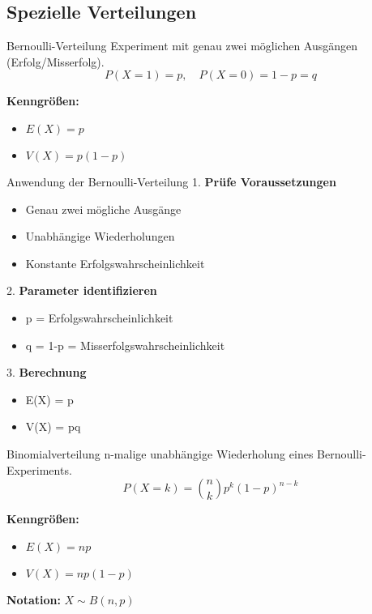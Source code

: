\subsection{Spezielle Verteilungen}

\begin{definition}{Bernoulli-Verteilung}
Experiment mit genau zwei möglichen Ausgängen (Erfolg/Misserfolg).
$$P(X=1) = p, \quad P(X=0) = 1-p = q$$

\textbf{Kenngrößen:}
\begin{itemize}
    \item $E(X) = p$
    \item $V(X) = p(1-p)$
\end{itemize}
\end{definition}

\begin{KR}{Anwendung der Bernoulli-Verteilung}
1. \textbf{Prüfe Voraussetzungen}
   \begin{itemize}
   \item Genau zwei mögliche Ausgänge
   \item Unabhängige Wiederholungen
   \item Konstante Erfolgswahrscheinlichkeit
   \end{itemize}

2. \textbf{Parameter identifizieren}
   \begin{itemize}
   \item p = Erfolgswahrscheinlichkeit
   \item q = 1-p = Misserfolgswahrscheinlichkeit
   \end{itemize}

3. \textbf{Berechnung}
   \begin{itemize}
   \item E(X) = p
   \item V(X) = pq
   \end{itemize}
\end{KR}

\begin{definition}{Binomialverteilung}
n-malige unabhängige Wiederholung eines Bernoulli-Experiments.
$$P(X=k) = \binom{n}{k}p^k(1-p)^{n-k}$$

\textbf{Kenngrößen:}
\begin{itemize}
    \item $E(X) = np$
    \item $V(X) = np(1-p)$
\end{itemize}

\textbf{Notation:} $X \sim B(n,p)$
\end{definition}

